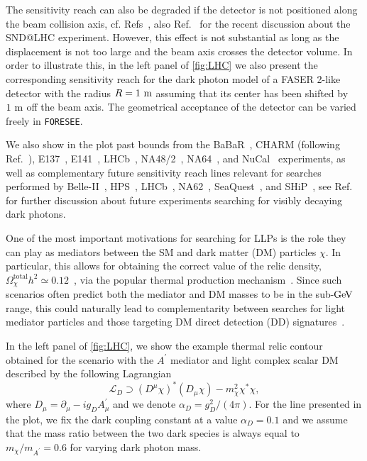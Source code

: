 \documentclass[prd,twocolumn,reprint,preprintnumbers,nofootinbib]{revtex4-1}
\begin{document}
The sensitivity reach can also be degraded if the detector is not positioned along the beam collision axis, cf. Refs~\cite{Ariga:2018uku,Ariga:2018uku}, also Ref.~\cite{Boyarsky:2021moj} for the recent discussion about the SND@LHC experiment. However, this effect is not substantial as long as the displacement is not too large and the beam axis crosses the detector volume. In order to illustrate this, in the left panel of \cref{fig:LHC} we also present the corresponding sensitivity reach for the dark photon model of a FASER 2-like detector with the radius $R=1~\text{m}$ assuming that its center has been shifted by $1~\text{m}$ off the beam axis. The geometrical acceptance of the detector can be varied freely in \texttt{FORESEE}. 

We also show in the plot past bounds from the BaBaR~\cite{Lees:2014xha}, CHARM (following Ref.~\cite{Gninenko:2012eq}), E137~\cite{Bjorken:1988as}, E141~\cite{Riordan:1987aw}, LHCb~\cite{Aaij:2019bvg}, NA48/2~\cite{Batley:2015lha}, NA64~\cite{Banerjee:2018vgk}, and NuCal~\cite{Blumlein:1990ay} experiments, as well as complementary future sensitivity reach lines relevant for searches performed by Belle-II~\cite{Kou:2018nap}, HPS~\cite{Battaglieri:2017aum}, LHCb~\cite{Ilten:2015hya,Ilten:2016tkc}, NA62~\cite{Dobrich:2018ezn}, SeaQuest~\cite{Berlin:2018pwi}, and SHiP~\cite{Ahdida:2020new}, see Ref.~\cite{Beacham:2019nyx} for further discussion about future experiments searching for visibly decaying dark photons. 
\medskip 

One of the most important motivations for searching for LLPs is the role they can play as mediators between the SM and dark matter (DM) particles $\chi$. In particular, this allows for obtaining the correct value of the relic density, $\Omega_\chi^{\textrm{total}} h^2\simeq 0.12$~\cite{Aghanim:2018eyx}, via the popular thermal production mechanism~\cite{Boehm:2003hm,Pospelov:2007mp,Feng:2008ya}. Since such scenarios often predict both the mediator and DM masses to be in the sub-$\text{GeV}$ range, this could naturally lead to complementarity between searches for light mediator particles and those targeting DM direct detection (DD) signatures~\cite{Batell:2009di}.

In the left panel of \cref{fig:LHC}, we show the example thermal relic contour obtained for the scenario with the $A^\prime$ mediator and light complex scalar DM described by the following Lagrangian
\begin{equation}
\mathcal{L}_D \supset (D^\mu\chi)^\ast(D_\mu\chi) - m_\chi^2\chi^\ast\chi,
\end{equation}
where $D_\mu = \partial_\mu - ig_DA^{\prime}_\mu$ and we denote $\alpha_D = g_D^2/(4\pi)$. For the line presented in the plot, we fix the dark coupling constant at a value $\alpha_D=0.1$ and we assume that the mass ratio between the two dark species is always equal to $m_{\chi}/m_{A^\prime} = 0.6$ for varying dark photon mass. 
\end{document}
